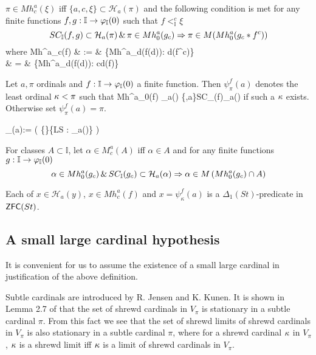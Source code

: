 \documentclass{article}
\newcommand{\mI}{\mathbb{I}}
\begin{document}
$\pi\in Mh^{a}_{c}(\xi)$ iff
 $\{a,c,\xi\}\subset\mathcal{H}_{a}(\pi)$ and
 the following condition is met for any 
 finite functions $f,g:\mI\to\vphi_{\mI}(0)$
 such that $f<_{\mI}^{c}\xi$
 \[
 SC_{\mI}(f,g) \subset\mathcal{H}_{a}(\pi) 
 \spand \pi\in Mh^{a}_{0}(g_{c})
 \Rarw \pi\in M(Mh^{a}_{0}(g_{c}*f^{c}))
\]
where
\beqnarrs
Mh^{a}_{c}(f) & := & \bigcap\{Mh^{a}_{d}(f(d)): d(f^{c})\}
\\
& = &
\bigcap\{Mh^{a}_{d}(f(d)): c\leq d(f)\}
\eeqnarrs




 Let $a,\pi$ ordinals and
 $f:\mI\to\vphi_{\mI}(0)$ a finite function.
Then $\psi_{\pi}^{f}(a)$ denotes the least ordinal $\kappa<\pi$ such that
\beqn\label{eq:Psivec}
\kappa\in Mh^{a}_{0}(f) \spand
 _{a}(\kappa)
 \cap\pi\subset\kappa
 \spand
   \{\pi,a\}\cup SC_{\mI}(f)\subset{}_{a}(\kappa)
\eeqn
if such a $\kappa$ exists. Otherwise set $\psi_{\pi}^{f}(a)=\pi$.







\beqn\label{eq:psiI}
\psi_{\mI}(a):=
\min(
\{\mI\}\cup\{\kap\in LS : _{a}(\kap)\cap\mI\subset\kap\}
)
\eeqn


For classes $A\subset{}$, let
$\alpha\in M^{a}_{c}(A)$ iff $\alpha\in A$ and
for any finite functions
$g:\mI\to\vphi_{\mI}(0)$
\begin{equation}\label{eq:Mca}
\alpha\in Mh_{0}^{a}(g_{c}) \spand SC_{\mI}(g_{c})\subset\mathcal{H}_{a}(\alpha) \Rarw
\alpha\in M\left( Mh_{0}^{a}(g_{c}) \cap A \right)
\end{equation}





\bprp\label{prp:definability}
Each of 
$x\in\mathcal{H}_{a}(y)$,
$x\in Mh^{a}_{c}(f)$ and $x=\psi^{f}_{\kappa}(a)$
is a $\Delta_{1}(St)$-predicate in ${\sf ZFC}(St)$.
\eprp



\subsection{A small large cardinal hypothesis}\label{subsec:largecardinal}
It is convenient for us to assume the existence of a small large cardinal in justification of 
the above definition.

Subtle cardinals are introduced by R. Jensen and K. Kunen.
It is shown in Lemma 2.7 of \cite{RathjenAFML2} that the set of shrewd cardinals
in $V_{\pi}$
is stationary in a subtle cardinal $\pi$.
From this fact we see that the set 
of shrewd limits of shrewd cardinals
in $V_{\pi}$ 
is also stationary in
 a subtle cardinal $\pi$, where
 for a shrewd cardinal $\kappa$ in $V_{\pi}$,
 $\kappa$ is a shrewd limit 
 iff $\kappa$ is a limit of shrewd cardinals in $V_{\pi}$.
\end{document}
